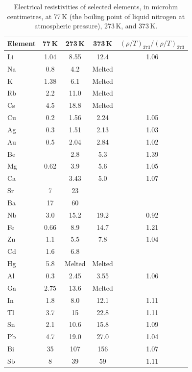 \begin{table}[ht]
    \centering
    \caption{Electrical resistivities of selected elements, in microhm centimetres, at 77\,K (the boiling point of liquid nitrogen at atmospheric pressure), 273\,K, and 373\,K.}
    \label{tab:drude-resistivity}
    \begin{tabular}{lcccc}
        \toprule
        Element & 77\,K & 273\,K & 373\,K & $(\rho/T)_{373}/(\rho/T)_{273}$ \\
        \midrule
        Li & 1.04 & 8.55 & 12.4 & 1.06 \\
        Na & 0.8  & 4.2  & Melted & \\
        K  & 1.38 & 6.1  & Melted & \\
        Rb & 2.2  & 11.0 & Melted & \\
        Cs & 4.5  & 18.8 & Melted & \\
        Cu & 0.2  & 1.56 & 2.24 & 1.05 \\
        Ag & 0.3  & 1.51 & 2.13 & 1.03 \\
        Au & 0.5  & 2.04 & 2.84 & 1.02 \\
        Be &      & 2.8  & 5.3  & 1.39 \\
        Mg & 0.62 & 3.9  & 5.6  & 1.05 \\
        Ca &      & 3.43 & 5.0  & 1.07 \\
        Sr & 7    & 23   &      & \\
        Ba & 17   & 60   &      & \\
        Nb & 3.0  & 15.2 & 19.2 & 0.92 \\
        Fe & 0.66 & 8.9  & 14.7 & 1.21 \\
        Zn & 1.1  & 5.5  & 7.8  & 1.04 \\
        Cd & 1.6  & 6.8  &      & \\
        Hg & 5.8  & Melted & Melted & \\
        Al & 0.3  & 2.45 & 3.55 & 1.06 \\
        Ga & 2.75 & 13.6 & Melted & \\
        In & 1.8  & 8.0  & 12.1 & 1.11 \\
        Tl & 3.7  & 15   & 22.8 & 1.11 \\
        Sn & 2.1  & 10.6 & 15.8 & 1.09 \\
        Pb & 4.7  & 19.0 & 27.0 & 1.04 \\
        Bi & 35   & 107  & 156  & 1.07 \\
        Sb & 8    & 39   & 59   & 1.11 \\
        \bottomrule
    \end{tabular}
\end{table}

